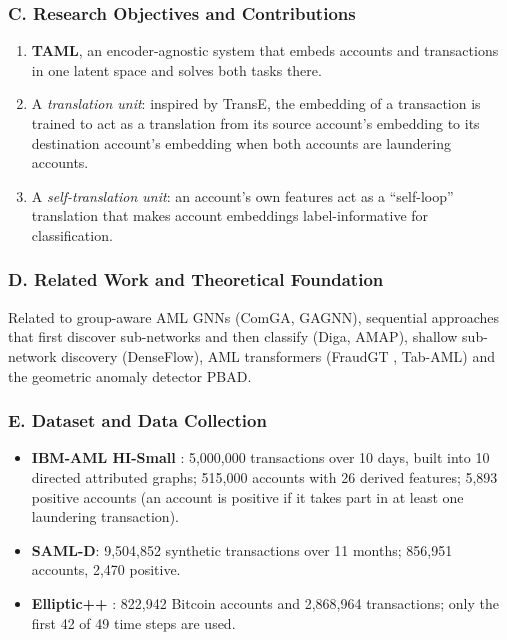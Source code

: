 \documentclass[11pt,a4paper]{article}
\begin{document}
\subsubsection*{C. Research Objectives and Contributions}
\begin{enumerate}[leftmargin=*]
    \item \textbf{TAML}, an encoder-agnostic system that embeds accounts and transactions in one latent space and solves both tasks there.
    \item A \textit{translation unit}: inspired by TransE, the embedding of a transaction is trained to act as a translation from its source account's embedding to its destination account's embedding when both accounts are laundering accounts.
    \item A \textit{self-translation unit}: an account's own features act as a ``self-loop'' translation that makes account embeddings label-informative for classification.
\end{enumerate}

\subsubsection*{D. Related Work and Theoretical Foundation}
Related to group-aware AML GNNs (ComGA, GAGNN), sequential approaches that first discover sub-networks and then classify (Diga, AMAP), shallow sub-network discovery (DenseFlow), AML transformers (FraudGT \cite{lin2024fraudgt}, Tab-AML) and the geometric anomaly detector PBAD.

\subsubsection*{E. Dataset and Data Collection}
\begin{itemize}[leftmargin=*]
    \item \textbf{IBM-AML HI-Small} \cite{altman2023ibmaml}: 5,000,000 transactions over 10 days, built into 10 directed attributed graphs; 515,000 accounts with 26 derived features; 5,893 positive accounts (an account is positive if it takes part in at least one laundering transaction).
    \item \textbf{SAML-D}: 9,504,852 synthetic transactions over 11 months; 856,951 accounts, 2,470 positive.
    \item \textbf{Elliptic++} \cite{elmougy2023ellipticpp}: 822,942 Bitcoin accounts and 2,868,964 transactions; only the first 42 of 49 time steps are used.
\end{itemize}
\end{document}

